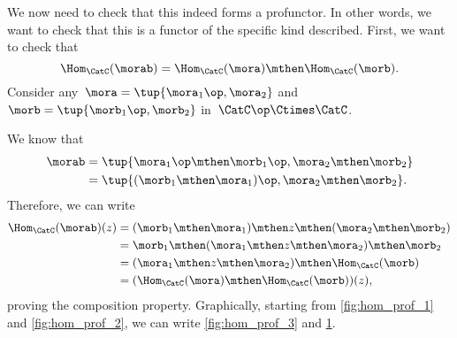 
We now need to check that this indeed forms a profunctor.
In other words, we want to check that this is a functor of the specific kind described.
First, we want to check that
%
\begin{equation}
    \label{eq:hom5}
    \Hom_\CatC(\morab)=\Hom_\CatC(\mora)\mthen \Hom_\CatC(\morb).
\end{equation}
Consider any~$\mora=\tup{\mora_1\op, \mora_2}$ and~$\morb=\tup{\morb_1\op,\morb_2}$ in~$\CatC\op \Ctimes \CatC$.

We know that
\begin{equation}
    \label{eq:hom6}
    \begin{aligned}
        \morab & =\tup{\mora_1\op \mthen \morb_1\op, \mora_2\mthen \morb_2} \\
               & =\tup{(\morb_1\mthen \mora_1)\op, \mora_2\mthen \morb_2}.
    \end{aligned}
\end{equation}
Therefore, we can write
\begin{equation}
    \label{eq:hom7}
    \begin{aligned}
        \Hom_\CatC(\morab)(z) & =(\morb_1\mthen \mora_1)\mthen z \mthen (\mora_2\mthen \morb_2) \\
                              & =\morb_1\mthen (\mora_1\mthen z \mthen \mora_2) \mthen \morb_2 \\
                              & =(\mora_1\mthen z \mthen \mora_2)\mthen \Hom_\CatC(\morb) \\
                              & =(\Hom_\CatC(\mora)\mthen \Hom_\CatC(\morb))(z),
    \end{aligned}
\end{equation}
proving the composition property.
Graphically, starting from \cref{fig:hom_prof_1} and \cref{fig:hom_prof_2}, we can write \cref{fig:hom_prof_3} and \cref{fig:hom_prof_4}.

\begin{marginfigure}
    \centering
    \caption{\label{fig:hom_prof_1}}
\end{marginfigure}
\begin{marginfigure}
    \centering
    \caption{\label{fig:hom_prof_2}}
\end{marginfigure}
\begin{marginfigure}
    \centering
    \caption{\label{fig:hom_prof_3}}
\end{marginfigure}
\begin{figure}[h!]
    \centering
    \caption{\label{fig:hom_prof_4}}
\end{figure}

